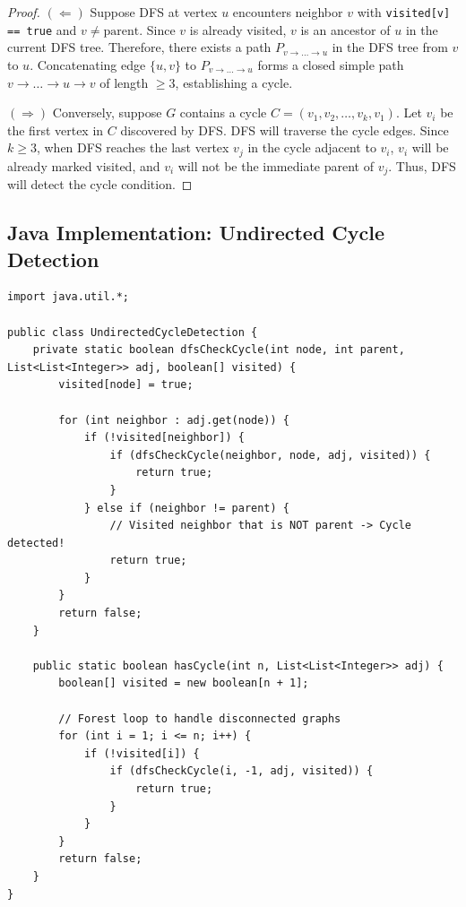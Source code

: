\documentclass[10pt,journal,compsoc,onecolumn]{IEEEtran}
\begin{document}
\begin{proof}
$(\Leftarrow)$ Suppose DFS at vertex $u$ encounters neighbor $v$ with \texttt{visited[v] == true} and $v \neq \text{parent}$. Since $v$ is already visited, $v$ is an ancestor of $u$ in the current DFS tree. Therefore, there exists a path $P_{v \to \dots \to u}$ in the DFS tree from $v$ to $u$. Concatenating edge $\{u, v\}$ to $P_{v \to \dots \to u}$ forms a closed simple path $v \to \dots \to u \to v$ of length $\ge 3$, establishing a cycle.

$(\Rightarrow)$ Conversely, suppose $G$ contains a cycle $C = (v_1, v_2, \dots, v_k, v_1)$. Let $v_i$ be the first vertex in $C$ discovered by DFS. DFS will traverse the cycle edges. Since $k \ge 3$, when DFS reaches the last vertex $v_j$ in the cycle adjacent to $v_i$, $v_i$ will be already marked visited, and $v_i$ will not be the immediate parent of $v_j$. Thus, DFS will detect the cycle condition.
\end{proof}

\subsection{Java Implementation: Undirected Cycle Detection}

\begin{verbatim}
import java.util.*;

public class UndirectedCycleDetection {
    private static boolean dfsCheckCycle(int node, int parent, List<List<Integer>> adj, boolean[] visited) {
        visited[node] = true;

        for (int neighbor : adj.get(node)) {
            if (!visited[neighbor]) {
                if (dfsCheckCycle(neighbor, node, adj, visited)) {
                    return true;
                }
            } else if (neighbor != parent) {
                // Visited neighbor that is NOT parent -> Cycle detected!
                return true;
            }
        }
        return false;
    }

    public static boolean hasCycle(int n, List<List<Integer>> adj) {
        boolean[] visited = new boolean[n + 1];

        // Forest loop to handle disconnected graphs
        for (int i = 1; i <= n; i++) {
            if (!visited[i]) {
                if (dfsCheckCycle(i, -1, adj, visited)) {
                    return true;
                }
            }
        }
        return false;
    }
}
\end{verbatim}
\end{document}
